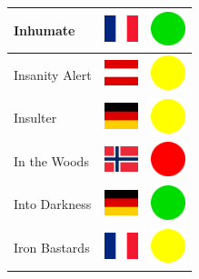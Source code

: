 \documentclass[12pt, a4paper, twoside]{report}
\begin{document}
\begin{center}
\begin{longtable}{|p{5cm}|p{2cm}|p{2cm}|}
Inhumate & \includegraphics[width=1cm]{4x3/fr} & \includegraphics[width=1cm]{likes/y} \\ \hline
Insanity Alert & \includegraphics[width=1cm]{4x3/at} & \includegraphics[width=1cm]{likes/m} \\ \hline
Insulter & \includegraphics[width=1cm]{4x3/de} & \includegraphics[width=1cm]{likes/m} \\ \hline
In the Woods & \includegraphics[width=1cm]{4x3/no} & \includegraphics[width=1cm]{likes/n} \\ \hline
Into Darkness & \includegraphics[width=1cm]{4x3/de} & \includegraphics[width=1cm]{likes/y} \\ \hline
Iron Bastards & \includegraphics[width=1cm]{4x3/fr} & \includegraphics[width=1cm]{likes/m} \\ \hline

\end{longtable}
\end{center}
\end{document}
